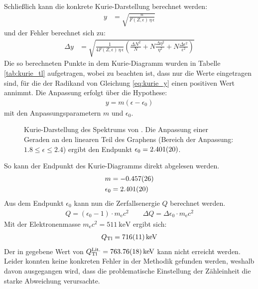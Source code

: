 \documentclass[11pt, a4paper]{article}
\numberwithin{equation}{section}
\begin{document}
Schließlich kann die konkrete Kurie-Darstellung berechnet werden:
\begin{align}
	y &= \sqrt{\frac{n}{F(Z,\epsilon) \, \eta \, \epsilon}}
	\label{eq:kurie_y}
\end{align}
und der Fehler berechnet sich zu:
\begin{align}
	\Delta y &= 
	\sqrt{\frac{1}{4 F(Z, \epsilon) \, \eta \, \epsilon}
	\left( \frac{\Delta N^2}{N} + N \frac{\Delta \eta^2}{\eta^2} + N \frac{\Delta \epsilon^2}{\epsilon^2} \right)
	}
\end{align}
Die so berechneten Punkte in dem Kurie-Diagramm wurden in Tabelle \ref{tab:kurie_tl} aufgetragen, wobei zu beachten ist, dass nur die Werte eingetragen sind, für die der Radikand von Gleichung \eqref{eq:kurie_y} einen positiven Wert annimmt.
Die Anpassung erfolgt über die Hypothese:
\begin{align}
	y = m (\epsilon - \epsilon_0)
\end{align}
mit den Anpassungsparametern $m$ und $\epsilon_0$.
\begin{figure}[h]
	\centering
	
	\caption{Kurie-Darstellung des Spektrums von . Die Anpassung einer Geraden an den linearen Teil des Graphens (Bereich der Anpassung: $\num{1.8} \leq \epsilon \leq {2.4}$) ergibt den Endpunkt $\epsilon_0 = \num{2.401 +- 0.020}$.}
	\label{fig:thallium_kurie}
\end{figure}
So kann der Endpunkt des Kurie-Diagramms direkt abgelesen werden.
\begin{align}
	m &= \num{-0.457 +- 0.026} \\
	\epsilon_0 &= \num{2.401 +- 0.020}
\end{align}
Aus dem Endpunkt $\epsilon_0$ kann nun die Zerfallsenergie $Q$ berechnet werden.
\begin{align}
	Q = (\epsilon_0 - 1) \cdot m_\mathrm{e} c^2 \qquad
	\Delta Q = \Delta \epsilon_0 \cdot m_\mathrm{e} c^2
	\label{eq:zerfallsenergie}
\end{align}
Mit der Elektronenmasse $m_\mathrm{e} c^2 = \SI{511}{\kilo\electronvolt}$ ergibt sich:
\begin{align}
	Q_\mathrm{Tl} = \SI{716 +- 11}{\kilo\electronvolt}
\end{align}
Der in \cite{tl_literatur} gegebene Wert von $Q_\mathrm{Tl}^\mathrm{Lit.} = \SI{763.76 +- 0.18}{\kilo\electronvolt}$ kann nicht erreicht werden.
Leider konnten keine konkreten Fehler in der Methodik gefunden werden, weshalb davon ausgegangen wird, dass die problematische Einstellung der Zähleinheit die starke Abweichung verursachte.
\FloatBarrier
\newpage
\end{document}
